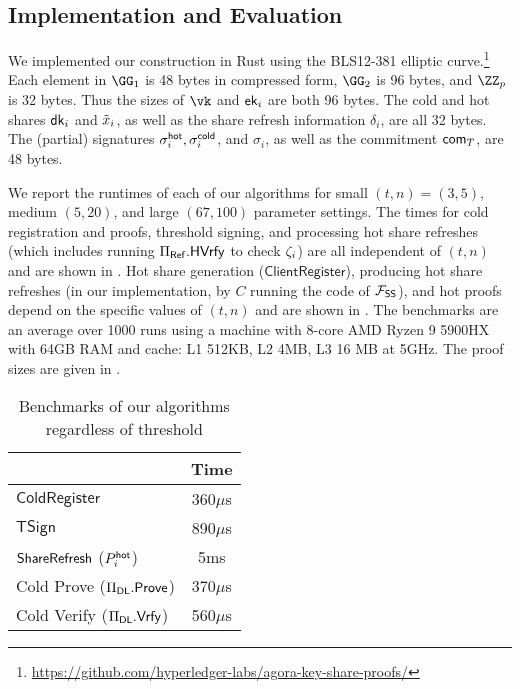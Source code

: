 \subsection{Implementation and Evaluation}\label{sec:eval}

We implemented our construction in Rust using the BLS12-381 elliptic curve.\footnote{\url{https://github.com/hyperledger-labs/agora-key-share-proofs/}}
Each element in $\GG_1$ is 48 bytes in compressed form, $\GG_2$ is 96 bytes, and $\ZZ_p$ is 32 bytes. Thus the sizes of $\vk$ and $\mathsf{ek}_i$ are both 96 bytes. The cold and hot shares $\mathsf{dk}_i$ and $\tilde{x}_i$, as well as the share refresh information $\delta_i$, are all 32 bytes. The (partial) signatures $\sigma_i^{\mathsf{hot}}, \sigma_i^{\mathsf{cold}}$, and $\sigma_i$, as well as the commitment $\mathsf{com}_{T}$, are 48 bytes. %

We report the runtimes of each of our algorithms for small $(t,n)=(3,5)$, %
medium $(5,20)$, %
and large $(67,100)$ parameter settings. %
The times for cold registration and proofs, threshold signing, and processing hot share refreshes (which includes running $\Pi_{\sf Ref}.{\sf H}\mathsf{Vrfy}$ to check $\zeta_i$) are all independent of $(t,n)$ and are shown in . Hot share generation ($\mathsf{ClientRegister}$), producing hot share refreshes (in our implementation, by $C$ running the code of $\mathcal{F}_\mathsf{SS}$), and hot proofs depend on the specific values of $(t,n)$ and are shown in .
The benchmarks are an average over 1000 runs using a machine with 8-core AMD Ryzen 9 5900HX with 64GB RAM and cache: L1 512KB, L2 4MB, L3 16 MB at 5GHz.
The proof sizes are given in . 

\begin{table}[tbh]
    \centering
    \begin{tabular}{lc}
        \toprule
        &
        Time \\\midrule
        $\mathsf{ColdRegister}$ & 360$\mu$s \\
        $\mathsf{TSign}$ & 890$\mu$s \\ 
        $\mathsf{ShareRefresh}$ ($P_i^{\mathsf{hot}}$) & 5ms \\
        Cold Prove ($\Pi_{\sf DL}.\mathsf{Prove}$) & 370$\mu$s \\
        Cold Verify ($\Pi_{\sf DL}.\mathsf{Vrfy}$) & 560$\mu$s \\\bottomrule
    \end{tabular}
    \caption{Benchmarks of our algorithms regardless of threshold}
    \label{tab:bench}
\end{table}

